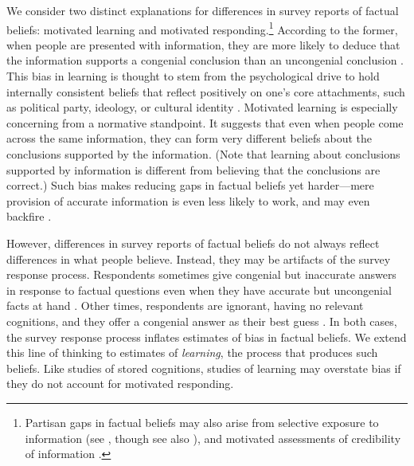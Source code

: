 \documentclass[12pt,letterpaper]{article}
\begin{document}
We consider two distinct explanations for differences in survey reports of factual beliefs: motivated learning and motivated responding.\footnote{Partisan gaps in factual beliefs may also arise from selective exposure to information (see \citealt{stroud2010}, though see also \citealt{prior2013}), and motivated assessments of credibility of information \citep[see, e.g.,][]{lord1979}.} According to the former, when people are presented with information, they are more likely to deduce that the information supports a congenial conclusion than an uncongenial conclusion \citep{jerit2012, kahan2013, kahan2017}. This bias in learning is thought to stem from the psychological drive to hold internally consistent beliefs that reflect positively on one's core attachments, such as political party, ideology, or cultural identity \citep{kunda1990}. Motivated learning is especially concerning from a normative standpoint. It suggests that even when people come across the same information, they can form very different beliefs about the conclusions supported by the information. (Note that learning about conclusions supported by information is different from believing that the conclusions are correct.) Such bias makes reducing gaps in factual beliefs yet harder---mere provision of accurate information is even less likely to work, and may even backfire \citep[see, e.g.,][]{nyhanreifler2010}.

However, differences in survey reports of factual beliefs do not always reflect differences in what people believe. Instead, they may be artifacts of the survey response process. Respondents sometimes give congenial but inaccurate answers in response to factual questions even when they have accurate but uncongenial facts at hand \citep{bullock2015, prior2015}. Other times, respondents are ignorant, having no relevant cognitions, and they offer a congenial answer as their best guess \citep{luskin2013}. In both cases, the survey response process inflates estimates of bias in factual beliefs. We extend this line of thinking to estimates of {\it learning}, the process that produces such beliefs. Like studies of stored cognitions, studies of learning may overstate bias if they do not account for motivated responding. 
\end{document}
